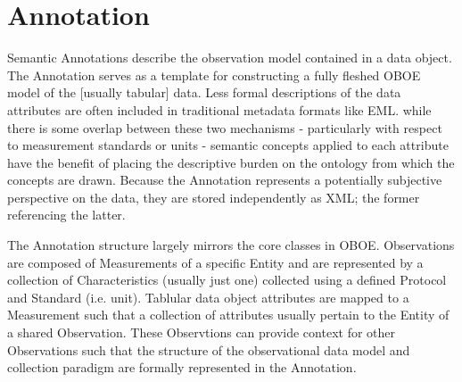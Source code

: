 
\section{Annotation}

Semantic Annotations describe the observation model contained in a data object. The Annotation serves as a template for constructing a fully fleshed OBOE model of the [usually tabular] data. Less formal descriptions of the data attributes are often included in traditional metadata formats like EML. while there is some overlap between these two mechanisms - particularly with respect to measurement standards or units - semantic concepts applied to each attribute have the benefit of placing the descriptive burden on the ontology from which the concepts are drawn. Because the Annotation represents a potentially subjective perspective on the data, they are stored independently as XML; the former referencing the latter.

The Annotation structure largely mirrors the core classes in OBOE. Observations are composed of Measurements of a specific Entity and are represented by a collection of Characteristics (usually just one) collected using a defined Protocol and Standard (i.e. unit). 
Tablular data object attributes are mapped to a Measurement such that a collection of attributes usually pertain to the Entity of a shared Observation. These Observtions can provide context for other Observations such that the structure of the observational data model and collection paradigm are formally represented in the Annotation.

